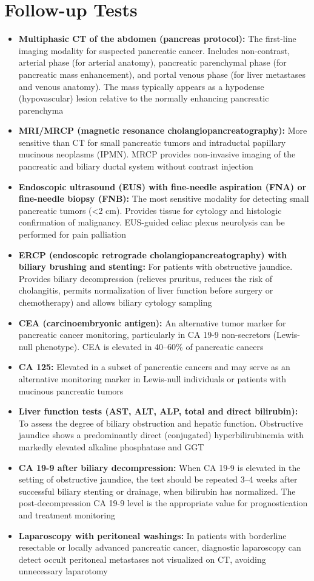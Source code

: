 \section*{Follow-up Tests}
\begin{itemize}
  \item \textbf{Multiphasic CT of the abdomen (pancreas protocol):} The first-line imaging modality for suspected pancreatic cancer. Includes non-contrast, arterial phase (for arterial anatomy), pancreatic parenchymal phase (for pancreatic mass enhancement), and portal venous phase (for liver metastases and venous anatomy). The mass typically appears as a hypodense (hypovascular) lesion relative to the normally enhancing pancreatic parenchyma
  \item \textbf{MRI/MRCP (magnetic resonance cholangiopancreatography):} More sensitive than CT for small pancreatic tumors and intraductal papillary mucinous neoplasms (IPMN). MRCP provides non-invasive imaging of the pancreatic and biliary ductal system without contrast injection
  \item \textbf{Endoscopic ultrasound (EUS) with fine-needle aspiration (FNA) or fine-needle biopsy (FNB):} The most sensitive modality for detecting small pancreatic tumors (<2 cm). Provides tissue for cytology and histologic confirmation of malignancy. EUS-guided celiac plexus neurolysis can be performed for pain palliation
  \item \textbf{ERCP (endoscopic retrograde cholangiopancreatography) with biliary brushing and stenting:} For patients with obstructive jaundice. Provides biliary decompression (relieves pruritus, reduces the risk of cholangitis, permits normalization of liver function before surgery or chemotherapy) and allows biliary cytology sampling
  \item \textbf{CEA (carcinoembryonic antigen):} An alternative tumor marker for pancreatic cancer monitoring, particularly in CA 19-9 non-secretors (Lewis-null phenotype). CEA is elevated in 40--60\% of pancreatic cancers
  \item \textbf{CA 125:} Elevated in a subset of pancreatic cancers and may serve as an alternative monitoring marker in Lewis-null individuals or patients with mucinous pancreatic tumors
  \item \textbf{Liver function tests (AST, ALT, ALP, total and direct bilirubin):} To assess the degree of biliary obstruction and hepatic function. Obstructive jaundice shows a predominantly direct (conjugated) hyperbilirubinemia with markedly elevated alkaline phosphatase and GGT
  \item \textbf{CA 19-9 after biliary decompression:} When CA 19-9 is elevated in the setting of obstructive jaundice, the test should be repeated 3--4 weeks after successful biliary stenting or drainage, when bilirubin has normalized. The post-decompression CA 19-9 level is the appropriate value for prognostication and treatment monitoring
  \item \textbf{Laparoscopy with peritoneal washings:} In patients with borderline resectable or locally advanced pancreatic cancer, diagnostic laparoscopy can detect occult peritoneal metastases not visualized on CT, avoiding unnecessary laparotomy
\end{itemize}

